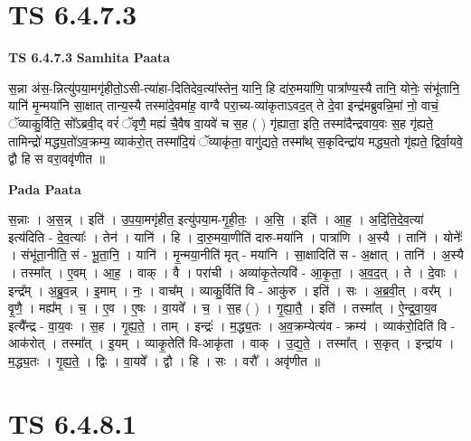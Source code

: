 \documentclass[17pt]{extarticle}
\begin{document}

\section{ TS 6.4.7.3 }

\textbf{TS 6.4.7.3 } \newline
\textbf{Samhita Paata} \newline

स॒न्ना अ॑स॒-न्नित्यु॑पया॒मगृ॑हीतो॒ऽसी-त्या॑हा-दितिदेव॒त्या᳚स्तेन॒ यानि॒ हि दा॑रु॒मया॑णि॒ पात्रा᳚ण्य॒स्यै तानि॒ योनेः॒ संभू॑तानि॒ यानि॑ मृ॒न्मया॑नि सा॒क्षात् तान्य॒स्यै तस्मा॑दे॒वमा॑ह॒ वाग्वै परा॒च्य-व्या॑कृताऽवद॒त् ते दे॒वा इन्द्र॑मब्रुवन्नि॒मां नो॒ वाचं॒ ॅव्याकु॒र्विति॒ सो᳚ऽब्रवी॒द् वरं॑ ॅवृणै॒ मह्यं॑ चै॒वैष वा॒यवे॑ च स॒ह ( ) गृ॑ह्याता॒ इति॒ तस्मा॑दैन्द्रवाय॒वः स॒ह गृ॑ह्यते॒ तामिन्द्रो॑ मद्ध्य॒तो॑ऽव॒क्रम्य॒ व्याक॑रो॒त् तस्मा॑दि॒यं ॅव्याकृ॑ता॒ वागु॑द्यते॒ तस्मा᳚थ् स॒कृदिन्द्रा॑य मद्ध्य॒तो गृ॑ह्यते॒ द्विर्वा॒यवे॒ द्वौ हि स वरा॒ववृ॑णीत ॥ \newline

\textbf{Pada Paata} \newline

स॒न्नाः । अ॒स॒न्न् । इति॑ । उ॒प॒या॒मगृ॑हीत॒ इत्यु॑पया॒म-गृ॒ही॒तः॒ । अ॒सि॒ । इति॑ । आ॒ह॒ । अ॒दि॒ति॒दे॒व॒त्या॑ इत्य॑दिति - दे॒व॒त्याः᳚ । तेन॑ । यानि॑ । हि । दा॒रु॒मया॒णीति॑ दारु-मया॑नि । पात्रा॑णि । अ॒स्यै । तानि॑ । योनेः᳚ । संभू॑ता॒नीति॒ सं - भू॒ता॒नि॒ । यानि॑ । मृ॒न्मया॒नीति॑ मृत् - मया॑नि । सा॒क्षादिति॑ स - अ॒क्षात् । तानि॑ । अ॒स्यै । तस्मा᳚त् । ए॒वम् । आ॒ह॒ । वाक् । वै । परा॑ची । अव्या॑कृ॒तेत्यवि॑ - आ॒कृ॒ता॒ । अ॒व॒द॒त् । ते । दे॒वाः । इन्द्र᳚म् । अ॒ब्रु॒व॒न्न् । इ॒माम् । नः॒ । वाच᳚म् । व्याकु॒र्विति॑ वि - आकु॑रु । इति॑ । सः । अ॒ब्र॒वी॒त् । वर᳚म् । वृ॒णै॒ । मह्य᳚म् । च॒ । ए॒व । ए॒षः । वा॒यवे᳚ । च॒ । स॒ह ( ) । गृ॒ह्या॒तै॒ । इति॑ । तस्मा᳚त् । ऐ॒न्द्र॒वा॒य॒व इत्यै᳚न्द्र - वा॒य॒वः । स॒ह । गृ॒ह्य॒ते॒ । ताम् । इन्द्रः॑ । म॒द्ध्य॒तः । अ॒व॒क्रम्येत्य॑व - क्रम्य॑ । व्याक॑रो॒दिति॑ वि - आक॑रोत् । तस्मा᳚त् । इ॒यम् । व्याकृ॒तेति॑ वि-आकृ॑ता । वाक् । उ॒द्य॒ते॒ । तस्मा᳚त् । स॒कृत् । इन्द्रा॑य । म॒द्ध्य॒तः । गृ॒ह्य॒ते॒ । द्विः । वा॒यवे᳚ । द्वौ । हि । सः । वरौ᳚ । अवृ॑णीत ॥  \newline





\section{ TS 6.4.8.1 }
\end{document}
